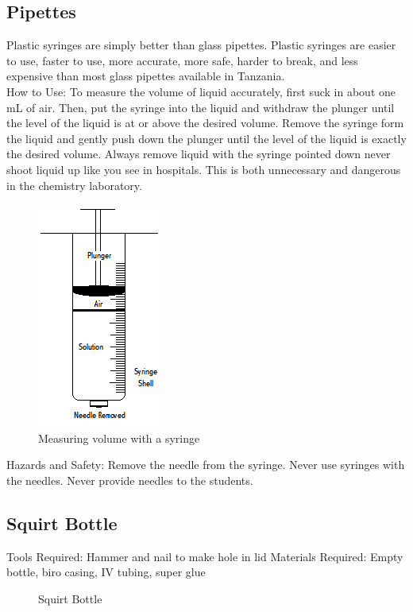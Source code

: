 \subsection*{Pipettes}
Plastic syringes are simply better than glass pipettes. Plastic syringes are easier to use, faster to use, more accurate, more safe, harder to break, and less expensive than most glass pipettes available in Tanzania.\\
How to Use: To measure the volume of liquid accurately, first suck in about one mL of air. Then, put the syringe into the liquid and withdraw the plunger until the level of the liquid is at or above the desired volume. Remove the syringe form the liquid and gently push down the plunger until the level of the liquid is exactly the desired volume. Always remove liquid with the syringe pointed down never shoot liquid up like you see in hospitals. This is both unnecessary and dangerous in the chemistry laboratory.
\begin{figure}[h]
\begin{center}
\includegraphics[scale=0.8]{img/syringe.png}
\caption{Measuring volume with a syringe}
\end{center}
\end{figure}

Hazards and Safety: Remove the needle from the syringe. Never use syringes with the needles. Never provide needles to the students.

\subsection*{Squirt Bottle}
Tools Required: Hammer and nail to make hole in lid
Materials Required: Empty bottle, biro casing, IV tubing, super glue

\begin{figure}[h]
\begin{center}
\def\svgwidth{50pt}

\caption{Squirt Bottle}
\end{center}
\end{figure}

